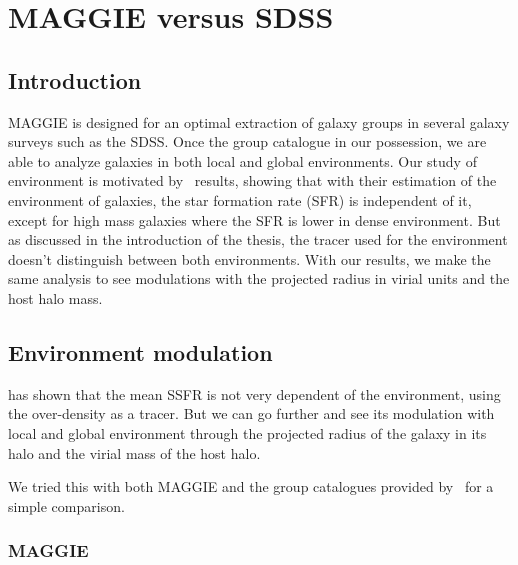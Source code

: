 \chapter[MAGGIE vs SDSS]{MAGGIE versus SDSS}
\label{cha:MAGGIE_vs_SDSS}

\minitoc%

\section{Introduction}
\label{sec:vs_introduction}

MAGGIE is designed for an optimal extraction of galaxy groups in several
galaxy surveys such as the SDSS\@. Once the group catalogue in our
possession, we are able to analyze galaxies in both local and global
environments. Our study of environment is motivated by~\cite{Peng+10}
results, showing that with their estimation of the environment of galaxies,
the star formation rate (SFR) is independent of it, except for high mass
galaxies where the SFR is lower in dense environment. But as discussed in
the introduction of the thesis, the tracer used for the environment doesn't
distinguish between both environments. With our results, we make the same
analysis to see modulations with the projected radius in virial units and
the host halo mass.

\section{Environment modulation}
\label{sec:environment_modulation}

\cite{Peng+10} has shown that the mean SSFR is not very dependent of the
environment, using the over-density as a tracer. But we can go further and
see its modulation with local and global environment through the projected
radius of the galaxy in its halo and the virial mass of the host halo.

We tried this with both MAGGIE and the group catalogues provided
by~\cite{Tempel+14} for a simple comparison.

\subsection{MAGGIE}
\label{sub:ssfr_maggie}

